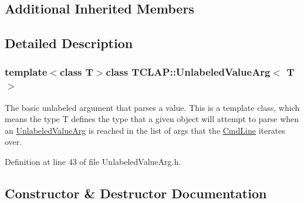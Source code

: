 \subsection*{Additional Inherited Members}


\subsection{Detailed Description}
\subsubsection*{template$<$class T$>$class T\+C\+L\+A\+P\+::\+Unlabeled\+Value\+Arg$<$ T $>$}

The basic unlabeled argument that parses a value. This is a template class, which means the type T defines the type that a given object will attempt to parse when an \hyperlink{class_t_c_l_a_p_1_1_unlabeled_value_arg}{Unlabeled\+Value\+Arg} is reached in the list of args that the \hyperlink{class_t_c_l_a_p_1_1_cmd_line}{Cmd\+Line} iterates over. 

Definition at line 43 of file Unlabeled\+Value\+Arg.\+h.



\subsection{Constructor \& Destructor Documentation}
\hypertarget{class_t_c_l_a_p_1_1_unlabeled_value_arg_acba2fddd0719ccd90f48fcf06aaffbee}{}
